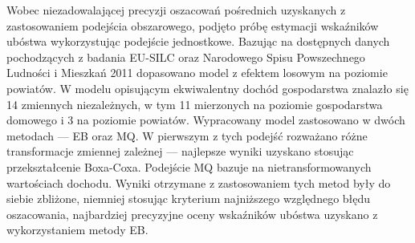 Wobec niezadowalającej precyzji oszacowań pośrednich uzyskanych z zastosowaniem podejścia obszarowego, podjęto próbę estymacji wskaźników ubóstwa wykorzystując podejście jednostkowe. Bazując na dostępnych danych pochodzących z badania EU-SILC oraz Narodowego Spisu Powszechnego Ludności i Mieszkań 2011 dopasowano model z efektem losowym na poziomie powiatów. W modelu opisującym ekwiwalentny dochód gospodarstwa znalazło się 14 zmiennych niezależnych, w tym 11 mierzonych na poziomie gospodarstwa domowego i 3 na poziomie powiatów. Wypracowany model zastosowano w dwóch metodach --- EB oraz MQ. W pierwszym z tych podejść rozważano różne transformacje zmiennej zależnej --- najlepsze wyniki uzyskano stosując przekształcenie Boxa-Coxa. Podejście MQ bazuje na nietransformowanych wartościach dochodu. Wyniki otrzymane z zastosowaniem tych metod były do siebie zbliżone, niemniej stosując kryterium najniższego względnego błędu oszacowania, najbardziej precyzyjne oceny wskaźników ubóstwa uzyskano z wykorzystaniem metody EB.
